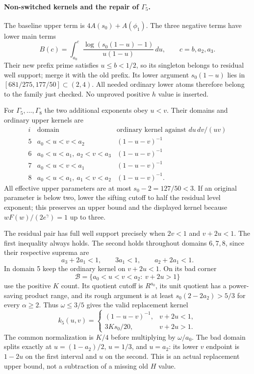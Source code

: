\documentclass[11pt]{article}
\begin{document}
\paragraph{Non-switched kernels and the repair of $\Gamma_5$.}
The baseline upper term is $4A(s_0)+A(\phi_1)$.
The three negative terms have lower main terms
\[
 B(c)=\int_{a_0}^{c}
 \frac{\log(s_0(1-u)-1)}{u(1-u)}\,du,
 \qquad c=b,a_2,a_3.
\]
Their new prefix prime satisfies $u\le b<1/2$, so its singleton
belongs to residual well support; merge it with the old prefix.
Its lower argument $s_0(1-u)$ lies in $[681/275,177/50]\subset(2,4)$.
All needed ordinary lower atoms therefore belong to the family just
checked.  No unproved positive $h$ value is inserted.

For $\Gamma_5,\ldots,\Gamma_8$ the two additional exponents obey
$u<v$.  Their domains and ordinary upper kernels are
\[
\begin{array}{c|c|c}
i&\text{domain}&\text{ordinary kernel against }du\,dv/(uv)\\\hline
5&a_0<u<v<a_2&(1-u-v)^{-1}\\
6&a_0<u<a_1,\ a_2<v<a_3&(1-u-v)^{-1}\\
7&a_0<u<v<a_1&(1-u-v)^{-1}\\
8&a_0<u<a_1,\ a_1<v<a_2&(1-u-v)^{-1}.
\end{array}
\]
All effective upper parameters are at most $s_0-2=127/50<3$.
If an original parameter is below two, lower the sifting cutoff to
half the residual level exponent; this preserves an upper bound and
the displayed kernel because $wF(w)/(2e^\gamma)=1$ up to three.

The residual pair has full well support precisely when
$2v<1$ and $v+2u<1$.  The first inequality always holds.  The second
holds throughout domains $6,7,8$, since their respective suprema are
\[
 a_3+2a_1<1,\qquad3a_1<1,\qquad a_2+2a_1<1.
\]
In domain 5 keep the ordinary kernel on $v+2u<1$.
On its bad corner
\[
 \mathcal B=\{a_0<u<v<a_2:\ v+2u>1\}
\]
use the positive $K$ count.  Its quotient cutoff is $R^{a_0}$,
its unit quotient has a power-saving product range, and its rough
argument is at least $s_0(2-2a_2)>5/3$ for every $\alpha\ge2$.
Thus $\omega\le3/5$ gives the valid replacement kernel
\begin{equation}\label{eq:second-seed-kernel}
 k_5(u,v)=
 \begin{cases}
 (1-u-v)^{-1},&v+2u<1,\\
 3Ks_0/20,&v+2u>1.
 \end{cases}
\end{equation}
The common normalization is $K/4$ before multiplying by $\omega/a_0$.
The bad domain splits exactly at
$u=(1-a_2)/2$, $u=1/3$, and $u=a_2$: its lower $v$ endpoint is
$1-2u$ on the first interval and $u$ on the second.
This is an actual replacement upper bound, not a subtraction of a
missing old $H$ value.
\end{document}
